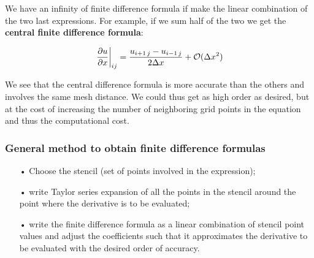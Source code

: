 We have an infinity of finite difference formula if make the linear combination of the two last expressions. For example, if we sum half of the two we get the \textbf{central finite difference formula}: 

\begin{equation}
 \left.\frac{\partial u }{\partial x}\right| _{ij} = \frac{u_{i+1\, j} - u_{i-1\, j}}{2\Delta x} +\mathcal{O}(\Delta x^2)
\end{equation}

We see that the central difference formula is more accurate than the others and involves the same mesh distance. We could thus get as high order as desired, but at the cost of increasing the number of neighboring grid points in the equation and thus the computational cost. 

\subsubsection{General method to obtain finite difference formulas}
\begin{itemize}
\item[•] Choose the stencil (set of points involved in the expression);
\item[•] write Taylor series expansion of all the points in the stencil around the point where the derivative is to be evaluated;
\item[•] write the finite difference formula as a linear combination of stencil point values and adjust the coefficients such that it approximates the derivative to be evaluated with the desired order of accuracy.
\end{itemize}


